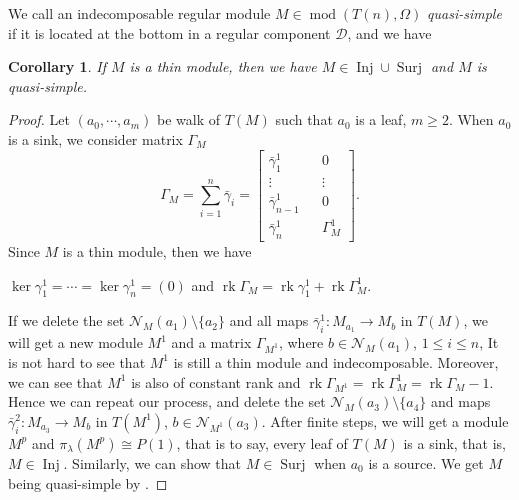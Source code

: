 \documentclass[a4paper,12pt]{amsart}
\newcommand{\cD}{\mathcal{D}}
\newcommand{\bg}{\bar{\gamma}}
\newcommand{\cN}{\mathcal{N}}
\DeclareMathOperator{\rk}{rk}
\DeclareMathOperator{\modd}{mod}
\DeclareMathOperator{\Inj}{Inj}
\DeclareMathOperator{\Sur}{Surj}
\newtheorem{corollary}[proposition]{Corollary}
\begin{document}
We call an indecomposable regular module $M\in \modd(T(n),\Omega)$ \textit{quasi-simple} if it is located at the bottom in a regular component $\cD$, and we have 

\begin{corollary}
If $M$ is a thin module, then we have $M\in\Inj\cup\Sur$ and $M$ is quasi-simple.
\end{corollary}

\begin{proof}
Let $(a_0,\cdots,a_m)$ be  walk of $T(M)$ such that $a_0$ is a leaf, $m\geq 2$. When  $a_0$ is a sink, we consider matrix $\Gamma_M$
$$\Gamma_M=\sum^n_{i=1}\bg_i=\begin{bmatrix}
\bg^1_1 &  &0 \\
\vdots &   & \vdots \\
\bg^1_{n-1} & & 0 \\
\bg^1_n &  &\Gamma^{1}_M 
\end{bmatrix}.$$
Since $M$ is a thin module, then we have 
\begin{center}
$\ker \gamma^1_1= \cdots =\ker \gamma^1_n=(0)$ and $\rk \Gamma_M=\rk\gamma^1_1+\rk \Gamma^1_M$.

\end{center}
If we delete the set  $\cN_M(a_1)\setminus\{a_2\}$ and all maps $\bg^1_i:M_{a_1}\rightarrow M_b$ in $T(M)$, we will get a new module $M^{1}$ and a matrix $\Gamma_{M^1}$, where $b\in \cN_M(a_1)$, $1\leq i\leq n$,  It is not hard to see that $M^{1}$ is still a thin module and indecomposable. Moreover, we can see that $M^{1}$ is also of constant rank and $\rk \Gamma_{M^1}=\rk\Gamma^1_M=\rk \Gamma_M-1$. Hence we can repeat our process, and delete the set $\cN_M(a_3)\setminus\{a_4\}$ and maps $\bg^2_i:M_{a_3}\rightarrow M_b$ in $T(M^1)$, $b\in \cN_{M^1}(a_3)$. After finite steps, we will get a module $M^p$ and $\pi_\lambda(M^p)\cong P(1)$, that is to say, every leaf of $T(M)$ is a sink, that is, $M\in \Inj$. Similarly, we can show that $M\in \Sur$ when $a_0$ is a source. We get $M$ being quasi-simple by \cite[Corollary 10.16]{Daniel}.

\end{proof}
\end{document}
